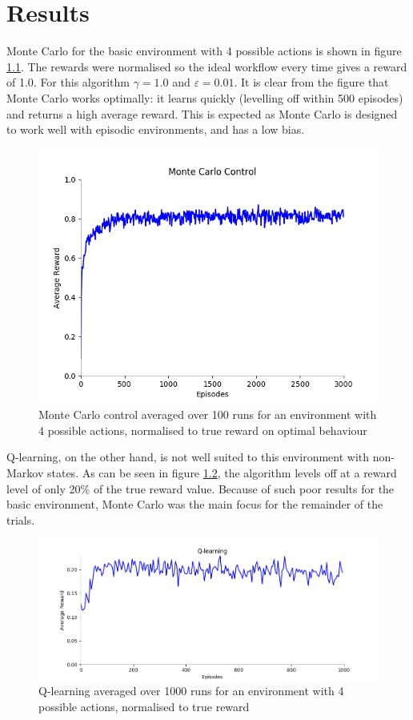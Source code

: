 \chapter{Results}
Monte Carlo for the basic environment with 4 possible actions is shown in figure \ref{fig:mcbasicfull}. The rewards were normalised so the ideal workflow every time gives a reward of 1.0. For this algorithm $\gamma=1.0$ and $\varepsilon=0.01$. It is clear from the figure that Monte Carlo works optimally: it learns quickly (levelling off within 500 episodes) and returns a high average reward. This is expected as Monte Carlo is designed to work well with episodic environments, and has a low bias.
\begin{figure}[h]
\includegraphics[width=\textwidth]{resultsbasic/21_100runs_3000_normalised}
\caption[Monte Carlo Control for Basic Environment]{Monte Carlo control averaged over 100 runs for an environment with 4 possible actions, normalised to true reward on optimal behaviour}
\label{fig:mcbasicfull}
\end{figure}

Q-learning, on the other hand, is not well suited to this environment with non-Markov states. As can be seen in figure \ref{fig:qgraph}, the algorithm levels off at a reward level of only 20\% of the true reward value. Because of such poor results for the basic environment, Monte Carlo was the main focus for the remainder of the trials.
\begin{figure}[h]
\includegraphics[width=\textwidth]{resultsq/basic10002}
\caption[Q-learning for the basic environment]{Q-learning averaged over 1000 runs for an environment with 4 possible actions, normalised to true reward}
\label{fig:qgraph}
\end{figure}

